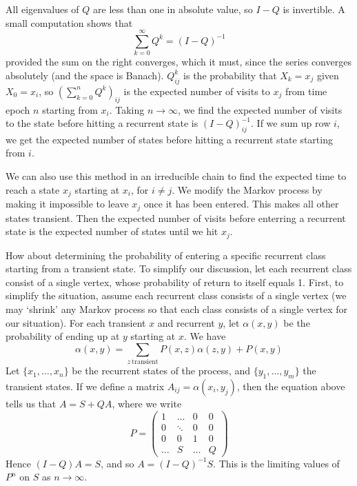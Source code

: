 All eigenvalues of $Q$ are less than one in absolute value, so $I - Q$ is invertible. A small computation shows that
%
\[ \sum_{k = 0}^\infty Q^k = (I - Q)^{-1} \]
%
provided the sum on the right converges, which it must, since the series converges absolutely (and the space is Banach). $Q^k_{ij}$ is the probability that $X_k = x_j$ given $X_0 = x_i$, so $(\sum_{k = 0}^n Q^k)_{ij}$ is the expected number of visits to $x_j$ from time epoch $n$ starting from $x_i$. Taking $n \to \infty$, we find the expected number of visits to the state before hitting a recurrent state is $(I - Q)^{-1}_{ij}$. If we sum up row $i$, we get the expected number of states before hitting a recurrent state starting from $i$.

We can also use this method in an irreducible chain to find the expected time to reach a state $x_j$ starting at $x_i$, for $i \neq j$. We modify the Markov process by making it impossible to leave $x_j$ once it has been entered. This makes all other states transient. Then the expected number of visits before enterring a recurrent state is the expected number of states until we hit $x_j$.

How about determining the probability of entering a specific recurrent class starting from a transient state. To simplify our discussion, let each recurrent class consist of a single vertex, whose probability of return to itself equals 1. First, to simplify the situation, assume each recurrent class consists of a single vertex (we may `shrink' any Markov process so that each class consists of a single vertex for our situation). For each transient $x$ and recurrent $y$, let $\alpha(x,y)$ be the probability of ending up at $y$ starting at $x$. We have
%
\[ \alpha(x,y) = \sum_{z\ \text{transient}} P(x, z) \alpha(z,y) + P(x, y) \]
%
Let $\{ x_1, \dots, x_n \}$ be the recurrent states of the process, and $\{ y_1, \dots, y_m \}$ the transient states. If we define a matrix $A_{ij} = \alpha(x_i, y_j)$, then the equation above tells us that $A = S + QA$, where we write
%
\[ P = \begin{pmatrix} 1 & \dots & 0 & 0 \\ 0 & \ddots & 0 & 0 \\ 0 & 0 & 1 & 0 \\ \dots & S & \dots & Q \end{pmatrix} \]
%
Hence $(I - Q)A = S$, and so $A = (I - Q)^{-1}S$. This is the limiting values of $P^n$ on $S$ as $n \to \infty$.


